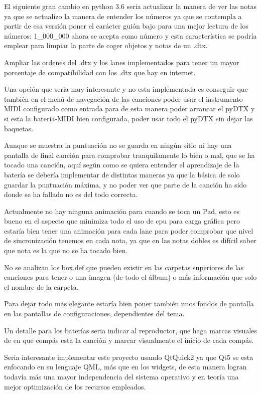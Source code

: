 \documentclass[a4paper,11pt,oneside]{book}
\begin{document}
El siguiente gran cambio en python 3.6 seria actualizar la manera de ver las notas ya que se actualizo la manera de entender los números ya que se contempla a partir de esa versión poner el carácter guión bajo para una mejor lectura de los números: 1\_000\_000 ahora se acepta como número y esta característica se podría emplear para limpiar la parte de coger objetos y notas de un .dtx.

Ampliar las ordenes del .dtx y los lanes implementados para tener un mayor porcentaje de compatibilidad con los .dtx que hay en internet.

Una opción que seria muy interesante y no esta implementada es conseguir que también en el menú de navegación de las canciones poder usar el instrumento-MIDI configurado como entrada para de esta manera poder arrancar el pyDTX y si esta la batería-MIDI bien configurada, poder usar todo el pyDTX sin dejar las baquetas.

Aunque se muestra la puntuación no se guarda en ningún sitio ni hay una pantalla de final canción para comprobar tranquilamente lo bien o mal, que se ha tocado una canción, aquí según como se quiera entender el aprendizaje de la batería se debería implementar de distintas maneras ya que la básica de solo guardar la puntuación máxima, y no poder ver que parte de la canción ha sido donde se ha fallado no es del todo correcta.

Actualmente no hay ninguna animación para cuando se toca un Pad, esto es bueno en el aspecto que minimiza todo el uso de cpu para carga gráfica pero estaría bien tener una animación para cada lane para poder comprobar que nivel de sincronización tenemos en cada nota, ya que en las notas dobles es difícil saber que nota es la que no se ha tocado bien.

No se analizan los box.def que pueden existir en las carpetas superiores de las canciones para tener o una imagen (de todo el álbum) o más información que solo el nombre de la carpeta.

Para dejar todo más elegante estaría bien poner también unos fondos de pantalla en las pantallas de configuraciones, dependientes del tema.

Un detalle para los baterías seria indicar al reproductor, que haga marcas visuales de en que compás esta la canción y marcar visualmente el inicio de cada compás.

Seria interesante implementar este proyecto usando QtQuick2 ya que Qt5 se esta enfocando en su lenguaje QML, más que en los widgets, de esta manera logran todavía más una mayor independencia del sistema operativo y en teoría una mejor optimización de los recursos empleados.
\end{document}
